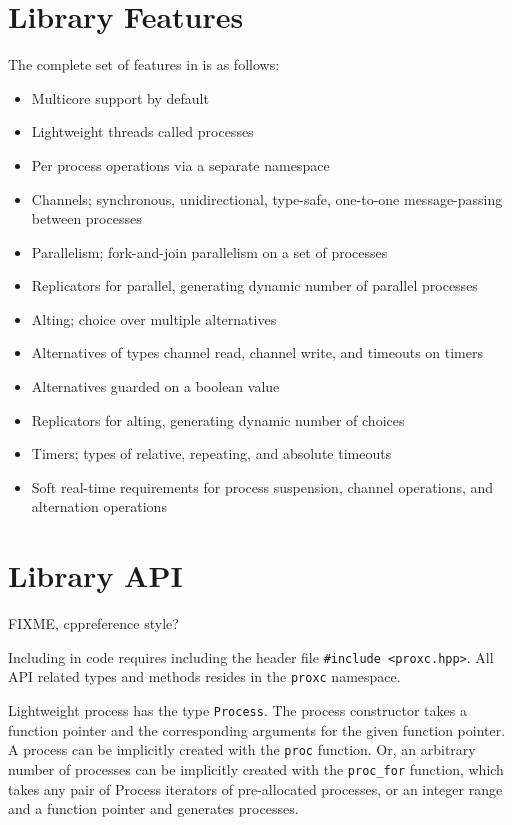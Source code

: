 \section{Library Features}
\label{sec:library_features}


The complete set of features in \Proxc{} is as follows:

\begin{itemize}[topsep=0em,itemsep=-1em,partopsep=0.5em,parsep=1em]
    \item Multicore support by default
    \item Lightweight threads called processes
    \item Per process operations via a separate namespace
    \item Channels; synchronous, unidirectional, type\hyp{}safe, one\hyp{}to\hyp{}one message\hyp{}passing between processes
    \item Parallelism; fork\hyp{}and\hyp{}join parallelism on a set of processes
    \item Replicators for parallel, generating dynamic number of parallel processes
    \item Alting; choice over multiple alternatives
    \item Alternatives of types channel read, channel write, and timeouts on timers
    \item Alternatives guarded on a boolean value
    \item Replicators for alting, generating dynamic number of choices
    \item Timers; types of relative, repeating, and absolute timeouts
    \item Soft real\hyp{}time requirements for process suspension, channel operations, and alternation operations
\end{itemize}


\section{Library API}
\label{sec:library_api}

FIXME, cppreference style?

Including \Proxc{} in code requires including the header file \lstinline[style={CustomC++}]|#include <proxc.hpp>|. All API related types and methods resides in the \lstinline[style={CustomC++}]|proxc| namespace. 

Lightweight process has the type \lstinline[style={CustomC++}]|Process|. The process constructor takes a function pointer and the corresponding arguments for the given function pointer. A process can be implicitly created with the \lstinline[style={CustomC++}]|proc| function. Or, an arbitrary number of processes can be implicitly created with the \lstinline[style={CustomC++}]|proc_for| function, which takes any pair of Process iterators of pre\hyp{}allocated processes, or an integer range and a function pointer and generates processes.

